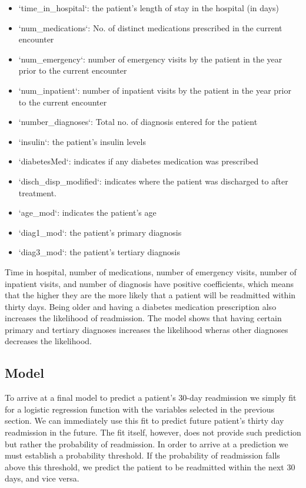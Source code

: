 \documentclass{article}
\begin{document}
\begin{itemize}
 
\item `time\_in\_hospital`: the patient’s length of stay in the hospital (in days)
\item `num\_medications`: No. of distinct medications prescribed in the current encounter
\item `num\_emergency`: number of emergency visits by the patient in the year prior to the current encounter
\item `num\_inpatient`: number of inpatient visits by the patient in the year prior to the current encounter
\item `number\_diagnoses`: Total no. of diagnosis entered for the patient
\item `insulin`: the patient's insulin levels
\item `diabetesMed`: indicates if any diabetes medication was prescribed 
\item `disch\_disp\_modified`: indicates where the patient was discharged to after treatment.
\item `age\_mod`: indicates the patient's age
\item `diag1\_mod`: the patient's primary diagnosis
\item `diag3\_mod`: the patient's tertiary diagnosis
\end{itemize}

Time in hospital, number of medications, number of emergency visits, number of inpatient visits, and number of diagnosis have positive coefficients, which means that the higher they are the more likely that a patient will be readmitted within thirty days. Being older and having a diabetes medication prescription also increases the likelihood of readmission. The model shows that having certain primary and tertiary diagnoses increases the likelihood wheras other diagnoses decreases the likelihood. 

\subsection{Model}

To arrive at a final model to predict a patient's 30-day readmission we simply fit for a logistic regression function with the variables selected in the previous section. We can immediately use this fit to predict future patient's thirty day readmission in the future. The fit itself, however, does not provide such prediction but rather the probability of readmission. In order to arrive at a prediction we must establish a probability threshold. If the probability of readmission falls above this threshold, we predict the patient to be readmitted within the next 30 days, and vice versa. \newline
\end{document}
